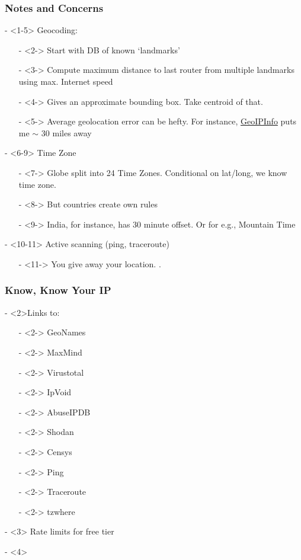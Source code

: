 \documentclass[compress]{beamer}
\begin{document}
\begin{frame}
\frametitle{Notes and Concerns}
\begin{large_enum}
  \item[-]<1-5> Geocoding:
    \begin{itemize} 
      \item[-]<2-> Start with DB of known `landmarks'
      \item[-]<3-> Compute maximum distance to last router from multiple landmarks using max. Internet speed
      \item[-]<4-> Gives an approximate bounding box. Take centroid of that.
      \item[-]<5-> Average geolocation error can be hefty. For instance, \href{http://www.geoipinfo.com/}{GeoIPInfo} puts me $\sim$ 30 miles away
    \end{itemize}
  \item[-]<6-9> Time Zone
    \begin{itemize}
      \item[-]<7-> Globe split into 24 Time Zones. Conditional on lat/long, we know time zone.
      \item[-]<8-> But countries create own rules 
      \item[-]<9-> India, for instance, has 30 minute offset. Or for e.g., Mountain Time
    \end{itemize}
  \item[-]<10-11> Active scanning (ping, traceroute)
  \begin{itemize}
    \item[-]<11-> You give away your location. .
  \end{itemize}
\end{large_enum}
\end{frame}

\begin{frame}[fragile]
\frametitle{Know, Know Your IP}
\begin{large_enum}
\item[-]<2>Links to:
  \begin{itemize}
  \item[-]<2-> GeoNames
  \item[-]<2-> MaxMind
  \item[-]<2-> Virustotal 
  \item[-]<2-> IpVoid
  \item[-]<2-> AbuseIPDB
  \item[-]<2-> Shodan
  \item[-]<2-> Censys
  \item[-]<2-> Ping
  \item[-]<2-> Traceroute
  \item[-]<2-> tzwhere
  \end{itemize}
\item[-]<3> Rate limits for free tier
\item[-]<4> \color{red}{Use it for a handful of IPs}
\end{large_enum}
\end{frame}
\end{document}
